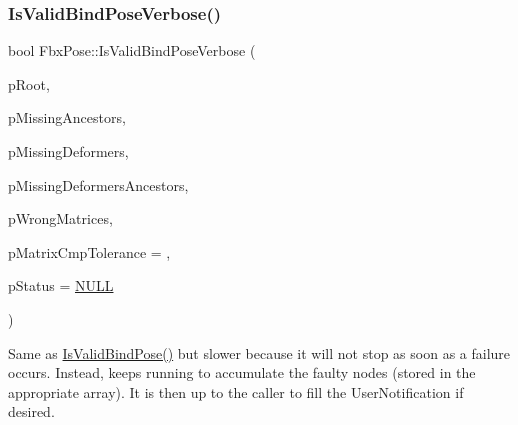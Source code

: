 \subsubsection{\texorpdfstring{Is\+Valid\+Bind\+Pose\+Verbose()}{IsValidBindPoseVerbose()}\hspace{0.1cm}{\footnotesize\ttfamily [1/2]}}
{\footnotesize\ttfamily bool Fbx\+Pose\+::\+Is\+Valid\+Bind\+Pose\+Verbose (\begin{DoxyParamCaption}\item[{\hyperlink{class_fbx_node}{Fbx\+Node} $\ast$}]{p\+Root,  }\item[{\hyperlink{fbxpose_8h_ad178cb63baf67bfc63da02aafae3a175}{Node\+List} \&}]{p\+Missing\+Ancestors,  }\item[{\hyperlink{fbxpose_8h_ad178cb63baf67bfc63da02aafae3a175}{Node\+List} \&}]{p\+Missing\+Deformers,  }\item[{\hyperlink{fbxpose_8h_ad178cb63baf67bfc63da02aafae3a175}{Node\+List} \&}]{p\+Missing\+Deformers\+Ancestors,  }\item[{\hyperlink{fbxpose_8h_ad178cb63baf67bfc63da02aafae3a175}{Node\+List} \&}]{p\+Wrong\+Matrices,  }\item[{double}]{p\+Matrix\+Cmp\+Tolerance = {},  }\item[{\hyperlink{class_fbx_status}{Fbx\+Status} $\ast$}]{p\+Status = {\ttfamily \hyperlink{fbxarch_8h_a070d2ce7b6bb7e5c05602aa8c308d0c4}{N\+U\+LL}} }\end{DoxyParamCaption})}

Same as \hyperlink{class_fbx_pose_ac5e304f440e64f4152aac437ab8fbddc}{Is\+Valid\+Bind\+Pose()} but slower because it will not stop as soon as a failure occurs. Instead, keeps running to accumulate the faulty nodes (stored in the appropriate array). It is then up to the caller to fill the User\+Notification if desired.


